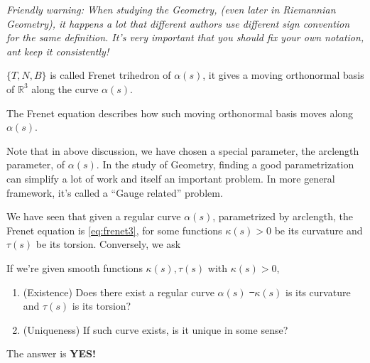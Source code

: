 \itshape{}
Friendly warning: When studying the Geometry, (even later in Riemannian Geometry),
it happens a lot that different authors use different sign convention for the same
definition. It's very important that you should fix your own notation, ant keep it
consistently!
\normalfont{}

\begin{definition}
    \(\{T,N,B\}\) is called Frenet trihedron of \(\alpha(s)\), it gives a moving 
    orthonormal basis of \(\mathbb{R}^3\) along the curve \(\alpha(s)\).
\end{definition}
The Frenet equation describes how such moving orthonormal basis moves along 
\(\alpha(s)\).

\begin{remark}
    Note that in above discussion, we have chosen a special parameter, the arclength
    parameter, of \(\alpha(s)\). In the study of Geometry, finding a good
    parametrization can simplify a lot of work and itself an important problem. In
    more general framework, it's called a ``Gauge related'' problem.
\end{remark}

We have seen that given a regular curve \(\alpha(s)\), parametrized by arclength,
the Frenet equation is \cref{eq:frenet3}, for some functions \(\kappa(s)>0\) be
its curvature and \(\tau(s)\) be its torsion. Conversely, we ask
\begin{question}
    If we're given smooth functions \(\kappa(s),\tau(s)\) with \(\kappa(s)>0\),
    \begin{enumerate}[(1)]
        \item (Existence) Does there exist a regular curve \(\alpha(s)\) \st\ 
            \(\kappa(s)\) is its curvature and \(\tau(s)\) is its torsion?
        \item (Uniqueness) If such curve exists, is it unique in some sense?
    \end{enumerate}
\end{question}
The answer is {\large\bfseries YES!}

